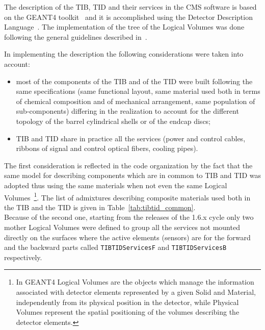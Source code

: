\documentclass{cmspaper}
\begin{document}
The description of the TIB, TID and their services in the CMS software
is based on the GEANT4 toolkit~\cite{geant4} and it is accomplished using the
Detector Description Language~\cite{ddl}. The implementation of the
tree of the Logical Volumes was done following
the general guidelines described in~\cite{rrValid}. 

In implementing the description the following considerations were
taken into account:
\begin{itemize}
\item most of the components of the TIB and of the TID were built
  following the same specifications (same functional layout, same material
  used both in terms of chemical composition and of mechanical
  arrangement, same population of sub-components) differing in
  the realization to account for the different topology of the
  barrel cylindrical shells or of the endcap discs;
\item TIB and TID share in practice all the services (power and control
  cables, ribbons of signal and control optical fibers, cooling pipes).
\end{itemize}
The first consideration is reflected in the code organization by the
fact that the same model for describing components
which are in common to TIB and TID was adopted  thus using the same materials when
not even the same Logical Volumes~\footnote{In GEANT4 Logical Volumes
  are the objects which manage the information associated with
  detector elements represented by a given Solid and Material,
  independently from its physical position in the detector, 
  while Physical Volumes represent the spatial positioning of the
  volumes describing the detector elements.}. 
The list of admixtures describing composite materials used both in the
TIB and the TID is given in Table~\ref{tab:tibtid_common}.\\ 
Because of the second one, starting from the releases of the 1.6.x cycle
only two mother Logical Volumes were defined to
group all the services not mounted directly on the surfaces where the
active elements (sensors) are for the forward and the backward parts 
called {\tt TIBTIDServicesF} and {\tt TIBTIDServicesB} respectively.
\end{document}
